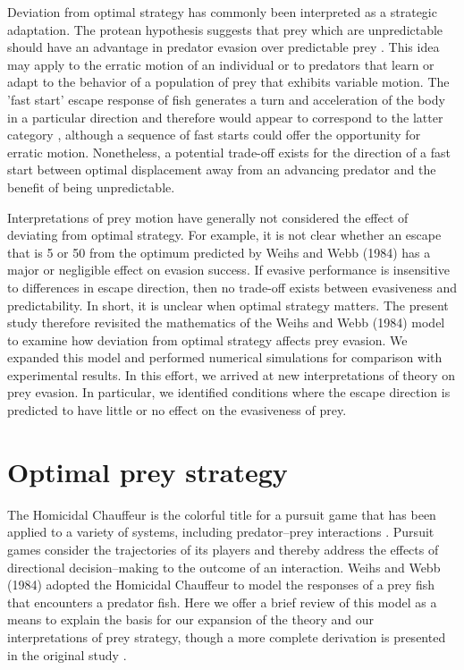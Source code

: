 \documentclass[12pt]{article}
\begin{document}
Deviation from optimal strategy has commonly been interpreted as a strategic
adaptation. The protean hypothesis suggests that prey which are unpredictable
should have an advantage in predator evasion over predictable prey
\citep{Humphries:1970hy}. This idea may apply to the erratic motion of an
individual or to predators that learn or adapt to the behavior of a population
of prey that exhibits variable motion. The 'fast start' escape response of fish
generates a turn and acceleration of the body in a particular direction and
therefore would appear to correspond to the latter category \citep{D:1973up},
although a sequence of fast starts could offer the opportunity for erratic
motion. Nonetheless, a potential trade-off exists for the direction of a fast
start between optimal displacement away from an advancing predator and the
benefit of being unpredictable.  

Interpretations of prey motion have generally not considered the effect of
deviating from optimal strategy. For example, it is not clear whether an escape
that is 5\textdegree\hspace{0.5pt} or 50\textdegree\hspace{0.5pt} from the
optimum predicted by Weihs and Webb (1984) has a major or negligible effect on
evasion success. If evasive performance is insensitive to differences in escape
direction, then no trade-off exists between evasiveness and predictability. In
short, it is unclear when optimal strategy matters. The present study therefore
revisited the mathematics of the Weihs and Webb (1984) model to examine how
deviation from optimal strategy affects prey evasion. We expanded this model
and performed numerical simulations for comparison with experimental results.
In this effort, we arrived at new interpretations of theory on prey evasion. In
particular, we identified conditions where the escape direction is predicted to
have little or no effect on the evasiveness of prey.

\section{Optimal prey strategy}
\label{opt_strategy}

The Homicidal Chauffeur is the colorful title for a pursuit game that has been
applied to a variety of systems, including predator--prey interactions
\citep{Isaacs:1965va}. Pursuit games consider the trajectories of its players
and thereby address the effects of directional decision--making to the outcome
of an interaction. Weihs and Webb (1984) adopted the Homicidal Chauffeur to
model the responses of a prey fish that encounters a predator fish. Here we
offer a brief review of this model as a means to explain the basis for our
expansion of the theory and our interpretations of prey strategy, though a more
complete derivation is presented in the original study
\citep{Weihs:1984tb}.
\end{document}
